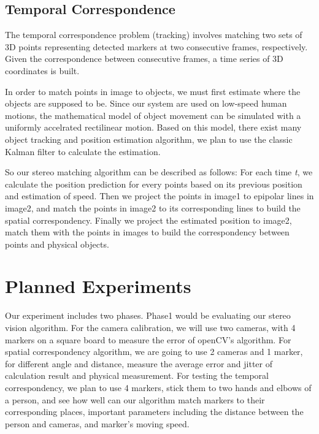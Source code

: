 \documentclass[10pt,twocolumn,letterpaper]{article}
\begin{document}
\subsection{Temporal Correspondence}
The temporal correspondence problem (tracking) involves matching 
two sets of 3D points representing detected markers at two consecutive
 frames, respectively. Given the correspondence between consecutive
 frames, a time series of 3D coordinates is built.

In order to match points in image to objects, we must first estimate 
where the objects are supposed to be. Since our system are used on low-speed
human motions, the mathematical model of object movement can be simulated with a 
uniformly accelrated rectilinear motion. Based on this model, there exist 
many object tracking and position estimation algorithm, we plan to use the
classic Kalman filter to calculate the estimation.

So our stereo matching algorithm can be described as follows: For each 
time {\em t}, we calculate the position prediction for every points based 
on its previous position and estimation of speed. 
Then we project the points in image1 to epipolar lines in image2, 
and match the points in image2 to its corresponding lines to build the 
spatial correspondency. Finally we project the estimated
position to image2, match them with the points in images to build the 
correspondency between points and physical objects.

\section{Planned Experiments}

Our experiment includes two phases. Phase1 would be evaluating 
our stereo vision algorithm. For the camera calibration, we will use 
two cameras, with 4 markers on a square board to measure the error 
of openCV's algorithm.
For spatial correspondency algorithm, we are going to use 2 cameras and 1 marker,
for different angle and distance, measure the average error and jitter of calculation
result and physical measurement.
For testing the temporal correspondency, we plan to use 4 markers, stick them to 
two hands and elbows of a person, and see how well can our algorithm match markers 
to their corresponding places, important parameters including the distance between 
the person and cameras, and marker's moving speed.
\end{document}
